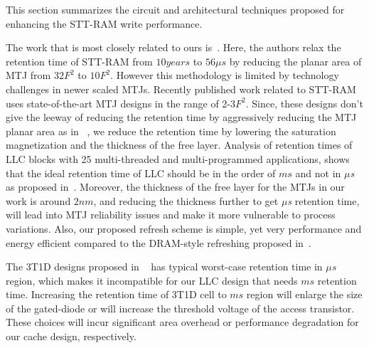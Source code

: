 


This section summarizes the circuit and architectural techniques proposed for enhancing the STT-RAM
write performance.

The work that is most closely related to ours is~\cite{STTRAM:HPCA11}.
Here, the authors relax the retention time of STT-RAM from $10 years$ to $56 \mu s$ by
reducing the planar area of MTJ from $32F^2$ to $10F^2$. However this methodology is limited by 
technology challenges in newer scaled MTJs. Recently published work related to
STT-RAM~\cite{PMTJ:Toshiba08,STTRAM:EDL11,STTRAM:Qualcomm09,STTRAM:Grandis11}
uses state-of-the-art MTJ designs in the range of 2-3$F^2$. Since, these designs don't give the
leeway of reducing the retention time by aggressively reducing the MTJ planar area as in~\cite{STTRAM:HPCA11} , we reduce the retention time by lowering the saturation magnetization and the thickness of the free layer. Analysis of retention times of LLC blocks with 25 multi-threaded and multi-programmed applications, shows that
the ideal retention time of LLC should be in the order of $ms$ and not in {\it $\mu$s} as proposed
in~\cite{STTRAM:HPCA11}. Moreover, the thickness of the free layer for the MTJs in our work is 
around $2nm$, and reducing the thickness further
to get {\it $\mu$s} retention time, will lead into MTJ reliability issues
and make it more vulnerable to process variations. Also, our proposed refresh scheme is simple, yet very performance and energy efficient compared to the DRAM-style refreshing proposed in~\cite{STTRAM:HPCA11}.

The 3T1D designs proposed in ~\cite{3T-brooks} has typical worst-case retention time in {\it $\mu$s} region, which makes it incompatible for our LLC design that needs $ms$ retention time. Increasing the retention time of 3T1D cell to $ms$ region will enlarge the size of the gated-diode or will increase the threshold voltage of the access transistor. These choices will incur significant area overhead or performance degradation for our cache design, respectively. 


